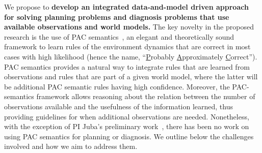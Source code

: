 \documentclass[12pt]{article}
\newcommand{\note}[1]{\textbf{\textit{#1}}}
\begin{document}



We propose to {\bf develop an integrated data-and-model driven approach for solving planning problems and diagnosis problems that use available observations and world models.} The key novelty in the proposed research is the use of PAC semantics~\cite{valiant2000robustLogics}, 
an elegant and theoretically sound framework to learn rules of the environment dynamics that are correct in most cases with high likelihood (hence the name, ``{\underline P}robably {\underline A}pproximately {\underline C}orrect''). PAC semantics provides a natural way to integrate rules that are learned from observations and rules that are part of a given world model, where the latter will be additional PAC semantic rules having high confidence. Moreover, the PAC-semantics framework allows reasoning about the relation between the number of observations available and the usefulness of the information learned, thus providing guidelines for when additional observations are needed. 
Nonetheless, with the exception of PI Juba's preliminary work~\cite{juba2016jmlr,juba2016aaai,zhang2017aaai}, there has been no work on using PAC semantics for planning or diagnosis. We outline below the challenges involved and how we aim to address them. 
\end{document}
